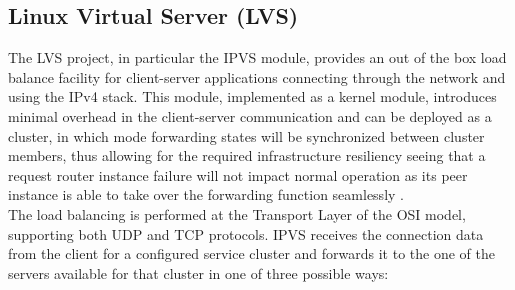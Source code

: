 \subsection{Linux Virtual Server (LVS)}
\label{subsection:LVS-implementation}
The \gls{LVS} project, in particular the \gls{IPVS} module, provides an out of the box load balance facility for client-server applications connecting through the network and using the \gls{IPv4} stack.
This module, implemented as a kernel module, introduces minimal overhead in the client-server communication and can be deployed as a cluster, in which mode forwarding states will be synchronized between cluster members, thus allowing for the required infrastructure resiliency seeing that a request router instance failure will not impact normal operation as its peer instance is able to take over the forwarding function seamlessly \cite{LVSSync}.\\
%
The load balancing is performed at the Transport Layer of the \gls{OSI} model, supporting both \gls{UDP} and \gls{TCP} protocols.
IPVS receives the connection data from the client for a configured service cluster and forwards it to the one of the servers available for that cluster in one of three possible ways\cite{IPVSHow}:
